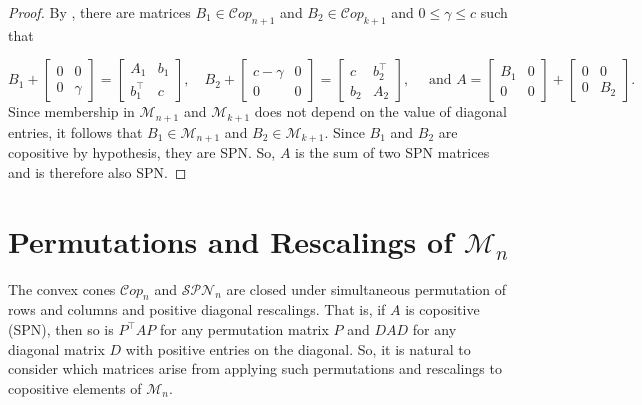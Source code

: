 \documentclass{amsart}
\newcommand{\cM}{\mathcal{M}}
\newcommand{\Cop}{\mathcal{C}op}
\newcommand{\SPN}{\mathcal{SPN}}
\theoremstyle{definition}
\begin{document}
\begin{proof}
By \cite[Lemma 3.10]{shaked-monderer_spn_2016}, there are matrices $B_1\in \Cop_{n+1}$ and $B_2\in \Cop_{k+1}$ and $0\leq \gamma\leq c$ such that

\[B_1 + \begin{bmatrix} 0& 0 \\0 &\gamma\end{bmatrix} = \begin{bmatrix}A_1 & b_1\\ b_1^\top & c \end{bmatrix}, \quad B_2 + \begin{bmatrix} c-\gamma & 0\\ 0 & 0 \end{bmatrix} = \begin{bmatrix} c & b_2^\top\\ b_2 & A_2\end{bmatrix}, \quad \text{ and } A = \begin{bmatrix} B_1 & 0\\ 0 & 0\end{bmatrix} + \begin{bmatrix} 0 & 0\\ 0 & B_2 \end{bmatrix}.\]
%
Since membership in $\cM_{n+1}$ and $\cM_{k+1}$ does not depend on the value of diagonal entries, it follows that $B_1 \in \cM_{n+1}$ and $B_2 \in \cM_{k+1}$. Since $B_1$ and $B_2$ are copositive by hypothesis, they are SPN. So, $A$ is the sum of two SPN matrices and is therefore also SPN.
\end{proof}

\section{Permutations and Rescalings of $\cM_n$}\label{sec:Orbits}

The convex cones $\Cop_n$ and $\SPN_n$ are closed under simultaneous permutation of rows and columns and positive diagonal rescalings. That is, if $A$ is copositive (SPN), then so is $P^\top A P$ for any permutation matrix $P$ and $D A D$ for any diagonal matrix $D$ with positive entries on the diagonal. 
So, it is natural to consider which matrices arise from applying such permutations and rescalings to copositive elements of $\cM_n$. 
\end{document}
